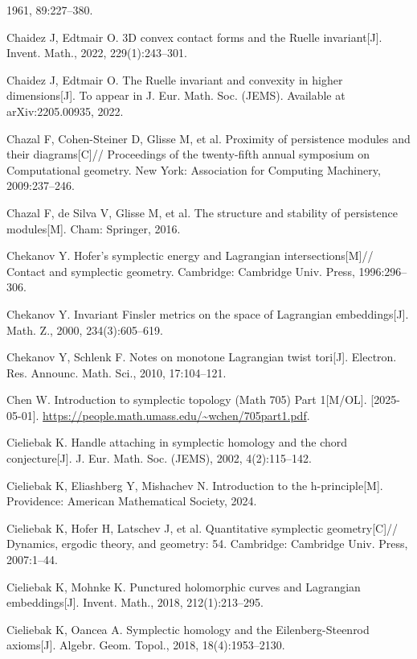 \begin{enumerate}[label={[\arabic*]},leftmargin=3.2em,itemsep=2pt,parsep=0pt]
        1961, 89:227--380.
  \item Chaidez J, Edtmair O. 3D convex contact forms and the Ruelle invariant[J].
        Invent. Math., 2022, 229(1):243--301.
  \item Chaidez J, Edtmair O. The Ruelle invariant and convexity in higher dimensions[J].
        To appear in J. Eur. Math. Soc. (JEMS). Available at arXiv:2205.00935, 2022.
  \item Chazal F, Cohen-Steiner D, Glisse M, et al. Proximity of persistence modules and
        their diagrams[C]// Proceedings of the twenty-fifth annual symposium on
        Computational geometry. New York: Association for Computing Machinery, 2009:237--246.
  \item Chazal F, de Silva V, Glisse M, et al. The structure and stability of persistence
        modules[M]. Cham: Springer, 2016.
  \item Chekanov Y. Hofer's symplectic energy and Lagrangian intersections[M]// Contact and
        symplectic geometry. Cambridge: Cambridge Univ. Press, 1996:296--306.
  \item Chekanov Y. Invariant Finsler metrics on the space of Lagrangian embeddings[J].
        Math. Z., 2000, 234(3):605--619.
  \item Chekanov Y, Schlenk F. Notes on monotone Lagrangian twist tori[J].
        Electron. Res. Announc. Math. Sci., 2010, 17:104--121.
  \item Chen W. Introduction to symplectic topology (Math 705) Part 1[M/OL].
        [2025-05-01]. \url{https://people.math.umass.edu/~wchen/705part1.pdf}.
  \item Cieliebak K. Handle attaching in symplectic homology and the chord conjecture[J].
        J. Eur. Math. Soc. (JEMS), 2002, 4(2):115--142.
  \item Cieliebak K, Eliashberg Y, Mishachev N. Introduction to the h-principle[M].
        Providence: American Mathematical Society, 2024.
  \item Cieliebak K, Hofer H, Latschev J, et al. Quantitative symplectic geometry[C]//
        Dynamics, ergodic theory, and geometry: 54. Cambridge: Cambridge Univ. Press,
        2007:1--44.
  \item Cieliebak K, Mohnke K. Punctured holomorphic curves and Lagrangian embeddings[J].
        Invent. Math., 2018, 212(1):213--295.
  \item Cieliebak K, Oancea A. Symplectic homology and the Eilenberg-Steenrod axioms[J].
        Algebr. Geom. Topol., 2018, 18(4):1953--2130.

\end{enumerate}
